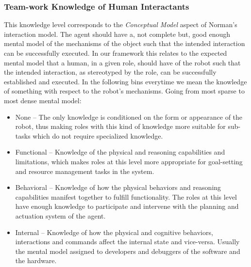 \documentclass[letterpaper, 10 pt, conference]{ieeeconf} %
\begin{document}
\subsubsection{Team-work Knowledge of Human Interactants}
This knowledge level corresponds to the \textit{Conceptual Model} aspect of Norman's interaction
model. The agent should have a, not complete but, good enough mental model of the mechanisms of the
object such that the intended interaction can be successfully executed. In our framework this
relates to the expected mental model that a human, in a given role, should have of the robot such
that the intended interaction, as stereotyped by the role, can be successfully established and
executed. In the following bins everytime we mean the knowledge of something with respect to the
robot's mechanisms. Going from most sparse to most dense mental model:
\begin{itemize}{}
  \item None -- The only knowledge is conditioned on the form or appearance of the robot, thus
    making roles with this kind of knowledge more suitable for sub-tasks which do not require
    specialized knowledge.
  \item Functional -- Knowledge of the physical and reasoning capabilities and limitations, which
    makes roles at this level more appropriate for goal-setting and resource management tasks in the
    system.
  \item Behavioral -- Knowledge of how the physical behaviors and reasoning capabilities manifest
    together to fulfill functionality. The roles at this level have enough knowledge to participate
    and intervene with the planning and actuation system of the agent.
  \item Internal -- Knowledge of how the physical and cognitive behaviors, interactions and commands
    affect the internal state and vice-versa. Usually the mental model assigned to developers and
    debuggers of the software and the hardware.
\end{itemize}
\end{document}
